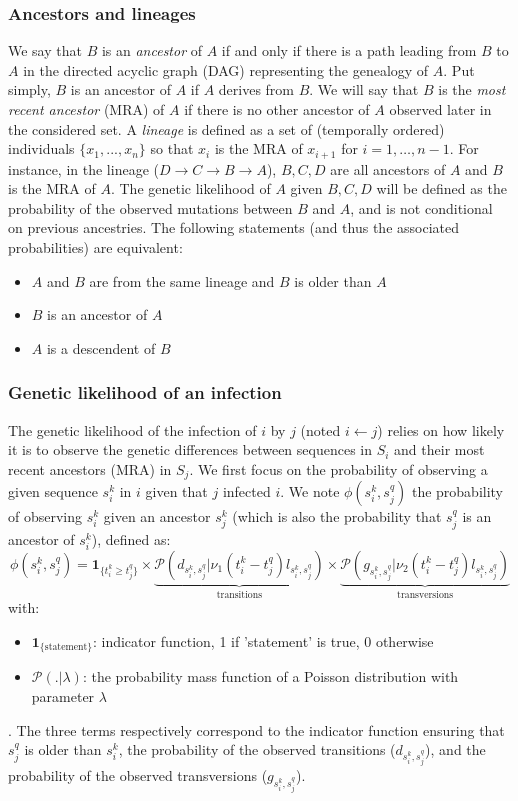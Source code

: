 \documentclass[10pt]{article}
\begin{document}
\subsubsection*{Ancestors and lineages}
\noindent We say that $B$ is an \textit{ancestor} of $A$ if and only if there is a path leading from $B$ to $A$ in the directed acyclic graph (DAG) representing the genealogy of $A$.
Put simply, $B$ is an ancestor of $A$ if $A$ derives from $B$.
We will say that $B$ is the \textit{most recent ancestor} (MRA) of $A$ if there is no other ancestor of $A$ observed later in the considered set.
A \textit{lineage} is defined as a set of (temporally ordered) individuals $\{x_1, ..., x_n\}$ so that $x_i$ is the MRA of $x_{i+1}$ for $i=1,\ldots,n-1$.
For instance, in the lineage ($D \rightarrow C \rightarrow B \rightarrow A$), $B,C,D$ are all ancestors of $A$ and $B$ is the MRA of $A$.
The genetic likelihood of $A$ given $B,C,D$ will be defined as the probability of the observed mutations between $B$ and $A$, and is not conditional on previous ancestries.
The following statements (and thus the associated probabilities) are equivalent:
\begin{itemize}
 \item $A$ and $B$ are from the same lineage and $B$ is older than $A$
 \item $B$ is an ancestor of $A$
 \item $A$ is a descendent of $B$
\end{itemize}


\subsubsection*{Genetic likelihood of an infection}
The genetic likelihood of the infection of $i$ by $j$ (noted $i \leftarrow j$) relies on how likely it is to observe the genetic differences between sequences in $S_i$ and their most recent ancestors (MRA) in $S_j$.
We first focus on the probability of observing a given sequence $s_i^k$ in $i$ given that $j$ infected $i$.
We note $\phi(s_i^k, s_j^q)$ the probability of observing $s_i^k$ given an ancestor $s_j^k$ (which is also the probability that $s_j^q$ is an ancestor of $s_i^k$), defined as:
$$
\phi(s_i^k, s_j^q) = \mathbf{1}_{\{t_i^k \geq t_j^q\}} \times 
\underbrace{\mathcal{P}\left(d_{s_i^k,s_j^q} | \nu_1 (t_i^k - t_j^q) l_{s_i^k,s_j^q}\right)}_{\mbox{transitions}}
\times \underbrace{\mathcal{P}\left(g_{s_i^k,s_j^q} | \nu_2 (t_i^k - t_j^q) l_{s_i^k,s_j^q}\right)}_{\mbox{transversions}}
$$
with:
\begin{itemize}
\item $\mathbf{1}_{\{\mbox{statement}\}}$: indicator function, 1 if 'statement' is true, 0 otherwise
\item $\mathcal{P}(.|\lambda)$: the probability mass function of a Poisson distribution with parameter $\lambda$
\end{itemize}
. The three terms respectively correspond to the indicator function ensuring that $s_j^q$ is older than $s_i^k$, the probability of the observed transitions ($d_{s_i^k,s_j^q}$), and the probability of the observed transversions ($g_{s_i^k,s_j^q}$). 
\\
\end{document}
